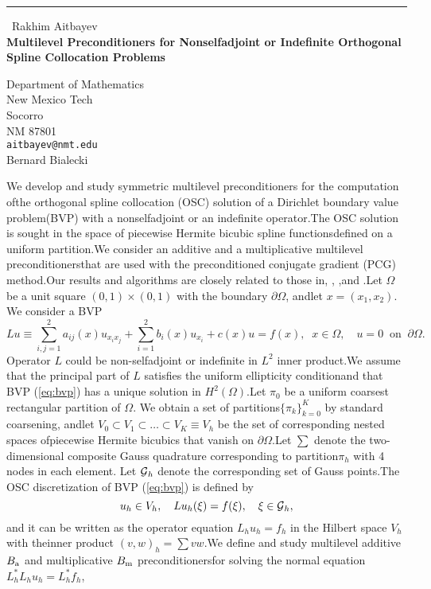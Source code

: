 \documentclass{report}
\begin{document}
\begin{center}
\rule{6in}{1pt} \
{\large Rakhim Aitbayev \\
{\bf Multilevel Preconditioners for Nonselfadjoint or Indefinite Orthogonal Spline Collocation Problems}}

Department of Mathematics \\ New Mexico Tech \\ Socorro \\ NM 87801
\\
{\tt aitbayev@nmt.edu}\\
Bernard Bialecki\end{center}

\newtheorem*{theorem}{Theorem}\newcommand{\GP}{\mbox{${\cal G}$}}\newcommand{\SH}{\mbox{$\scriptscriptstyle H^{2}(\Omega)$}}\newcommand{\SL}{\mbox{$\scriptscriptstyle L^{2}(\Omega)$}}We develop and study symmetric multilevel preconditioners for the computation ofthe orthogonal spline collocation (OSC) solution of a Dirichlet boundary value problem(BVP) with a nonselfadjoint or an indefinite operator.The OSC solution is sought in the space of piecewise Hermite bicubic spline functionsdefined on a uniform partition.We consider an additive and a multiplicative multilevel preconditionersthat are used with the preconditioned conjugate gradient (PCG) method.Our results and algorithms are closely related to those in\cite{Aitbayev_Bialecki_2003},
\cite{Bialecki_1998},
\cite{Bialecki_Dryja_1997},and \cite{SBG_1996}.Let $\Omega$ be a unit square $(0,1)\times(0,1)$ with the boundary $\partial\Omega$,
andlet $x=(x_1,x_2)$.
We consider a BVP\begin{equation}\label{eq:bvp}Lu\equiv\sum_{i,j=1}^{2} a_{ij}(x)u_{x_ix_j}+\sum_{i=1}^{2} b_i(x) u_{x_i}+c(x)u = f(x),\;\;x\in\Omega,\quad u=0 \;\;\mbox{on}\;\;\partial\Omega.\end{equation}Operator $L$ could be non-selfadjoint or indefinite in $L^2$ inner product.We assume that the principal part of $L$ satisfies the uniform ellipticity conditionand that BVP (\ref{eq:bvp}) has a unique solution in $H^2(\Omega)$.Let $\pi_0$ be a uniform coarsest rectangular partition of $\Omega$.
We obtain a set of partitions$\{\pi_k\}_{k=0}^{K}$ by standard coarsening,
andlet $V_0\subset V_1\subset\ldots\subset V_K\equiv V_h$ be the set of corresponding nested spaces ofpiecewise Hermite bicubics that vanish on $\partial\Omega$.Let $\sum$ denote the two-dimensional composite Gauss quadrature corresponding to partition$\pi_h$ with 4 nodes in each element.
Let $\GP_h$ denote the corresponding set of Gauss points.The OSC discretization of BVP (\ref{eq:bvp}) is defined by\begin{equation}\label{eq:osc}u_h\in V_h,\quad Lu_h(\xi)=f(\xi),\quad\xi\in\GP_h,\end{equation}and it can be written as the operator equation $L_hu_h=f_h$ in the Hilbert space $V_h$ with theinner product $(v,w)_h=\sum vw$.We define and study multilevel additive$B_{\textup{\scriptsize a}}$ and multiplicative $B_{\textup{\scriptsize m}}$ preconditionersfor solving the normal equation $L_h^*L_hu_h=L_h^*f_h$,
\end{document}

